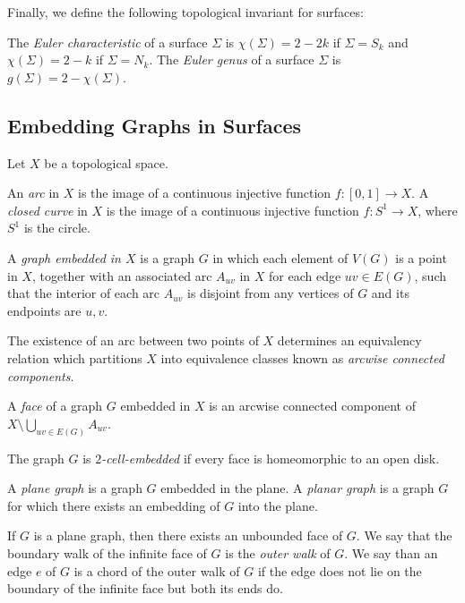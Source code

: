 Finally, we define the following topological invariant for surfaces:

\begin{definition}
The \emph{Euler characteristic} of a surface $\Sigma$ is $\chi(\Sigma) = 2 - 2k$ if $\Sigma = S_k$
and $\chi(\Sigma) = 2 - k$ if $\Sigma = N_k$. The \emph{Euler genus} of a surface $\Sigma$ is
$g(\Sigma) = 2 - \chi(\Sigma)$. 
\end{definition}

 

\subsection{Embedding Graphs in Surfaces}

Let $X$ be a topological space. 

\begin{definition}
An \emph{arc} in $X$ is the image of a continuous injective 
function $f : [0, 1] \rightarrow X$. A \emph{closed curve} in $X$ is the image
of a continuous injective function $f : S^1 \rightarrow X$, where $S^1$ is the circle.
\end{definition}

\begin{definition}
A \emph{graph embedded in $X$} is a graph $G$ in which each element
of $V(G)$ is a point in $X$, together with an associated arc $A_{uv}$ in $X$ for each edge $uv \in E(G)$, such that the 
interior of each arc $A_{uv}$
is disjoint from any vertices of $G$ and its endpoints are $u, v$. 
\end{definition}

The existence of an arc between two points of $X$ determines an equivalency relation which 
partitions $X$ into equivalence classes known as \emph{arcwise connected components}.

\begin{definition}
A \emph{face} of a graph $G$ embedded in $X$ is an arcwise connected component of
$X \setminus \bigcup_{uv \in E(G)} A_{uv}$. 

The graph $G$ is \emph{$2$-cell-embedded} if every face is homeomorphic to an open disk.
\end{definition}


\begin{definition}
A \emph{plane graph} is a graph $G$ embedded in the plane. A \emph{planar graph} is a graph $G$ for which there exists an embedding of $G$ into the plane. 

If $G$ is a plane graph, then there exists an unbounded face of $G$. We say 
that the boundary walk of the infinite face of $G$ is the \emph{outer walk} of $G$. We say
than an edge $e$ of $G$ is a chord of the outer walk of $G$ if the edge does not lie on the
boundary of the infinite face but both its ends do. 
\end{definition}

